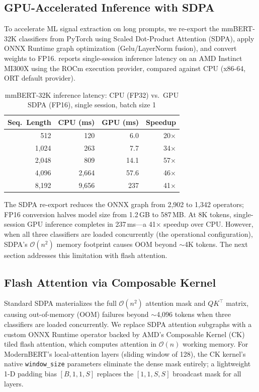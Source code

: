 \subsection{GPU-Accelerated Inference with SDPA}

To accelerate ML signal extraction on long prompts, we re-export the mmBERT-32K classifiers from PyTorch using Scaled Dot-Product Attention (SDPA), apply ONNX Runtime graph optimization (Gelu/LayerNorm fusion), and convert weights to FP16.
 reports single-session inference latency on an AMD Instinct MI300X using the ROCm execution provider, compared against CPU (x86-64, ORT default provider).

\begin{table}[htbp]
\centering
\caption{mmBERT-32K inference latency: CPU (FP32) vs.\ GPU SDPA (FP16), single session, batch size 1}
\label{tab:gpu_acceleration}
\begin{tabular}{rrrr}
\toprule
\textbf{Seq.\ Length} & \textbf{CPU (ms)} & \textbf{GPU (ms)} & \textbf{Speedup} \\
\midrule
512    & 120   & 6.0   & 20$\times$ \\
1{,}024  & 263   & 7.7   & 34$\times$ \\
2{,}048  & 809   & 14.1  & 57$\times$ \\
4{,}096  & 2{,}664 & 57.6  & 46$\times$ \\
8{,}192  & 9{,}656 & 237   & 41$\times$ \\
\bottomrule
\end{tabular}
\end{table}

The SDPA re-export reduces the ONNX graph from 2{,}902 to 1{,}342 operators; FP16 conversion halves model size from 1.2\,GB to 587\,MB.
At 8K tokens, single-session GPU inference completes in 237\,ms---a 41$\times$ speedup over CPU.
However, when all three classifiers are loaded concurrently (the operational configuration), SDPA's $\mathcal{O}(n^2)$ memory footprint causes OOM beyond $\sim$4K tokens.
The next section addresses this limitation with flash attention.

\subsection{Flash Attention via Composable Kernel}
\label{sec:flash_attention}

Standard SDPA materializes the full $\mathcal{O}(n^2)$ attention mask and $QK^\top$ matrix, causing out-of-memory (OOM) failures beyond $\sim$4{,}096 tokens when three classifiers are loaded concurrently.
We replace SDPA attention subgraphs with a custom ONNX Runtime operator backed by AMD's Composable Kernel (CK) tiled flash attention, which computes attention in $\mathcal{O}(n)$ working memory.
For ModernBERT's local-attention layers (sliding window of 128), the CK kernel's native \texttt{window\_size} parameters eliminate the dense mask entirely; a lightweight 1-D padding bias $[B,1,1,S]$ replaces the $[1,1,S,S]$ broadcast mask for all layers.

